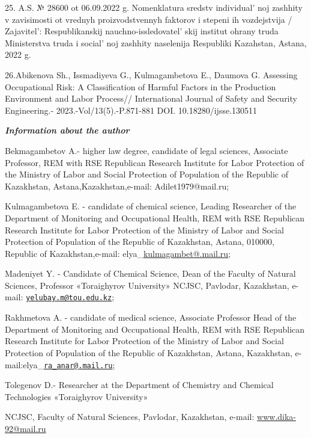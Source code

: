 \begin{references}
25. A.S. № 28600 ot 06.09.2022 g. Nomenklatura sredstv
individual' noj zashhity v zavisimosti ot vrednyh
proizvodstvennyh faktorov i stepeni ih vozdejstvija /
Zajavitel': Respublikanskij
nauchno-issledovatel' skij institut ohrany truda
Ministerstva truda i social' noj zashhity naselenija
Respubliki Kazahstan, Astana, 2022 g.

26.Abikenova Sh., Issmadiyeva G., Kulmagambetova E., Daumova G.
Assessing Occupational Risk: A Classification of Harmful Factors in the
Production Environment and Labor Process// International Journal of
Safety and Security Engineering.- 2023.-Vol/13(5).-P.871-881
DOI. 10.18280/ijsse.130511
\end{references}

\begin{authorinfo}
\emph{{\bfseries Information about the author}}

Bekmagambetov A.- higher law degree, candidate of legal sciences,
Associate Professor, REM with RSE Republican Research Institute for
Labor Protection of the Ministry of Labor and Social Protection of
Population of the Republic of Kazakhstan, Astana,Kazakhstan,e-mail:
Adilet1979@mail.ru;

Kulmagambetova E. - candidate of chemical science, Leading Researcher of
the Department of Monitoring and Occupational Health, REM with RSE
Republican Research Institute for Labor Protection of the Ministry of
Labor and Social Protection of Population of the Republic of Kazakhstan,
Astana, 010000, Republic of Kazakhstan,e-mail:
elya\_\href{mailto:kulmagambet@.mail.ruedu.kz}{kulmagambet@.mail.ru};

Madeniyet Y. - Candidate of Chemical Science, Dean of the Faculty of
Natural Sciences, Professor «Toraighyrov University» NCJSC, Pavlodar,
Kazakhstan, e-mail:
\href{mailto:yelubay.m@tou.edu.kz}{\nolinkurl{yelubay.m@tou.edu.kz}};

Rakhmetova A. - candidate of medical science, Associate Professor Head
of the Department of Monitoring and Occupational Health, REM with RSE
Republican Research Institute for Labor Protection of the Ministry of
Labor and Social Protection of Population of the Republic of Kazakhstan,
Astana, Kazakhstan,
e-mail:elya\_\href{mailto:ra_anar@.mail.ru}{\nolinkurl{ra\_anar@.mail.ru}};

Tolegenov D.- Researcher at the Department of Chemistry and Chemical
Technologies «Toraighyrov University»

NCJSC, Faculty of Natural Sciences, Pavlodar, Kazakhstan, e-mail:
\href{http://www.dika-92@mail.ru}{www.dika-92@mail.ru}


\end{authorinfo}
